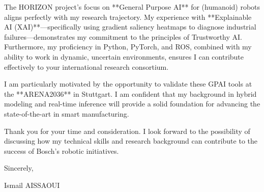 \documentclass[11pt,a4paper]{article}
\begin{document}
The HORIZON project’s focus on **General Purpose AI** for (humanoid) robots aligns perfectly with my research trajectory. My experience with **Explainable AI (XAI)**—specifically using gradient saliency heatmaps to diagnose industrial failures—demonstrates my commitment to the principles of Trustworthy AI. Furthermore, my proficiency in Python, PyTorch, and ROS, combined with my ability to work in dynamic, uncertain environments, ensures I can contribute effectively to your international research consortium.

I am particularly motivated by the opportunity to validate these GPAI tools at the **ARENA2036** in Stuttgart. I am confident that my background in hybrid modeling and real-time inference will provide a solid foundation for advancing the state-of-the-art in smart manufacturing.

Thank you for your time and consideration. I look forward to the possibility of discussing how my technical skills and research background can contribute to the success of Bosch's robotic initiatives.

\bigskip

\noindent Sincerely,

\bigskip

\noindent Ismail AISSAOUI
\end{document}
